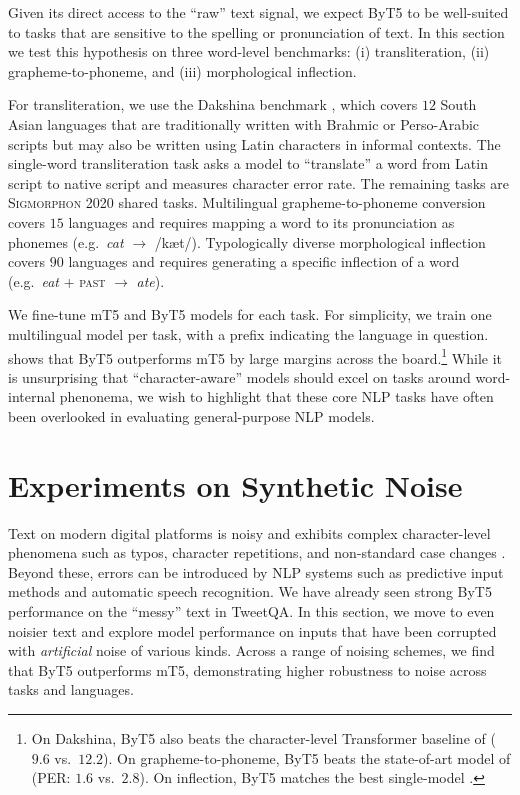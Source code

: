 \documentclass[11pt,a4paper]{article}
\begin{document}


Given its direct access to the ``raw'' text signal, we expect ByT5 to be well-suited to tasks that are sensitive to the spelling or pronunciation of text. In this section we test this hypothesis on three word-level benchmarks: (i) transliteration, (ii) grapheme-to-phoneme, and (iii) morphological inflection.

For transliteration, we use the Dakshina benchmark \cite{roark-etal-2020-processing}, which covers $12$ South Asian languages that are traditionally written with Brahmic or Perso-Arabic scripts but may also be written using Latin characters in informal contexts. The single-word transliteration task asks a model to ``translate'' a word from Latin script to native script and measures character error rate. The remaining tasks are \textsc{Sigmorphon} 2020 shared tasks. Multilingual grapheme-to-phoneme conversion \cite{gorman-etal-2020-sigmorphon} covers $15$ languages and requires mapping a word to its pronunciation as phonemes (e.g.~\textit{cat} $\rightarrow$ /k\ae{}t/). Typologically diverse morphological inflection \cite{vylomova-etal-2020-sigmorphon} covers $90$ languages and requires generating a specific inflection of a word (e.g.~\textit{eat} + \textsc{past} $\rightarrow$ \textit{ate}).

We fine-tune mT5 and ByT5 models for each task. For simplicity, we train one multilingual model per task, with a prefix indicating the language in question.  shows that ByT5 outperforms mT5 by large margins across the board.\footnote{On Dakshina, ByT5 also beats the character-level Transformer baseline of \citet{roark-etal-2020-processing} ($9.6$ vs.~$12.2$). On grapheme-to-phoneme, ByT5 beats the state-of-art model of \citet{yu-etal-2020-ensemble} (PER: $1.6$ vs.~$2.8$). On inflection, ByT5 matches the best single-model \cite{peters-martins-2020-one}.} While it is unsurprising that ``character-aware'' models should excel on tasks around word-internal phenonema, we wish to highlight that these core NLP tasks have often been overlooked in evaluating general-purpose NLP models.

\section{Experiments on Synthetic Noise}
\label{sec:noise}

Text on modern digital platforms is noisy and exhibits complex character-level phenomena such as typos, character repetitions, and non-standard case changes \cite{caswell2020language}. Beyond these, errors can be introduced by NLP systems such as predictive input methods and automatic speech recognition. We have already seen strong ByT5 performance on the ``messy'' text in TweetQA. In this section, we move to even noisier text and explore model performance on inputs that have been corrupted with \emph{artificial} noise of various kinds. Across a range of noising schemes, we find that ByT5 outperforms mT5, demonstrating higher robustness to noise across tasks and languages.
\end{document}

